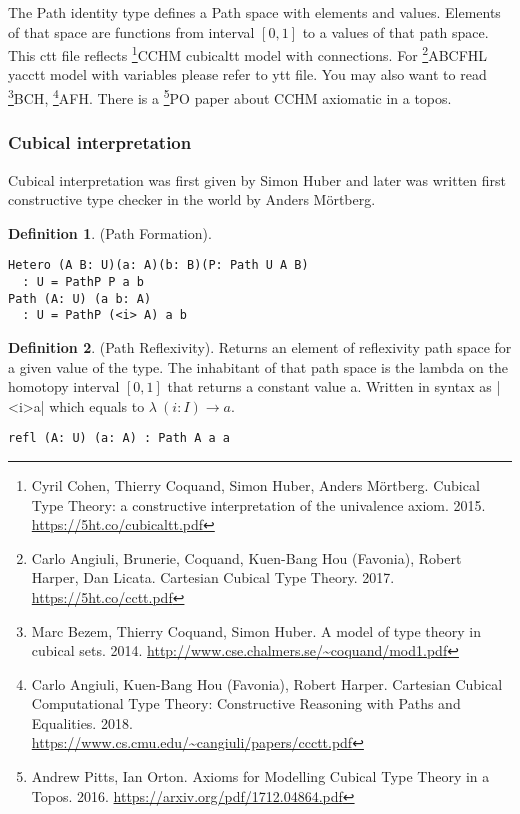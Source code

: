 \documentclass{article}
\theoremstyle{definition}
\newtheorem{definition}{Definition}
\begin{document}
The Path identity type defines a Path space with elements and values.
Elements of that space are functions from interval $[0,1]$ to a values of that path space.
This ctt file reflects \footnote{Cyril Cohen, Thierry Coquand, Simon Huber, Anders M{\"{o}}rtberg. Cubical Type Theory: a constructive interpretation of the univalence axiom. 2015. \url{https://5ht.co/cubicaltt.pdf}}{CCHM} cubicaltt model with connections.
For \footnote{Carlo Angiuli, Brunerie, Coquand, Kuen-Bang Hou (Favonia), Robert Harper, Dan Licata. Cartesian Cubical Type Theory. 2017. \url{https://5ht.co/cctt.pdf}}{ABCFHL} yacctt model with
variables please refer to ytt file. You may also want to
read \footnote{Marc Bezem, Thierry Coquand, Simon Huber. A model of type theory in cubical sets. 2014. \url{http://www.cse.chalmers.se/~coquand/mod1.pdf}}{BCH},
\footnote{Carlo Angiuli, Kuen-Bang Hou (Favonia), Robert Harper. Cartesian Cubical Computational Type Theory: Constructive Reasoning with Paths and Equalities. 2018. \\ \url{https://www.cs.cmu.edu/~cangiuli/papers/ccctt.pdf}}{AFH}.
There is a \footnote{Andrew Pitts, Ian Orton. Axioms for Modelling Cubical Type Theory in a Topos. 2016. \url{https://arxiv.org/pdf/1712.04864.pdf}}{PO} paper about CCHM axiomatic in a topos.

\subsubsection*{Cubical interpretation}

Cubical interpretation was first given by Simon Huber\cite{Huber16} and later was
written first constructive type checker in the world by Anders M{\"{o}}rtberg\cite{Mortberg17}.

\begin{definition} (Path Formation).
\begin{lstlisting}
Hetero (A B: U)(a: A)(b: B)(P: Path U A B)
  : U = PathP P a b
Path (A: U) (a b: A)
  : U = PathP (<i> A) a b
\end{lstlisting}
\end{definition}

\begin{definition} (Path Reflexivity).
Returns an element of reflexivity path space for a given value of the type.
The inhabitant of that path space is the lambda on the homotopy
interval $[0,1]$ that returns a constant value a. Written in
syntax as |<i>a| which equals to $\lambda\ (i: I) \rightarrow a$.
\begin{lstlisting}
refl (A: U) (a: A) : Path A a a
\end{lstlisting}
\end{definition}
\end{document}
